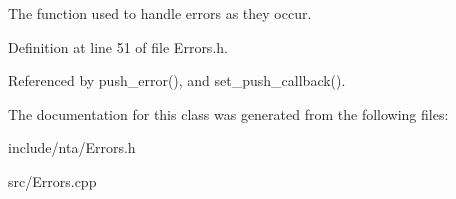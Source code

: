 The function used to handle errors as they occur. 



Definition at line 51 of file Errors.\+h.



Referenced by push\+\_\+error(), and set\+\_\+push\+\_\+callback().



The documentation for this class was generated from the following files\+:\begin{DoxyCompactItemize}
\item 
include/nta/Errors.\+h\item 
src/Errors.\+cpp\end{DoxyCompactItemize}
